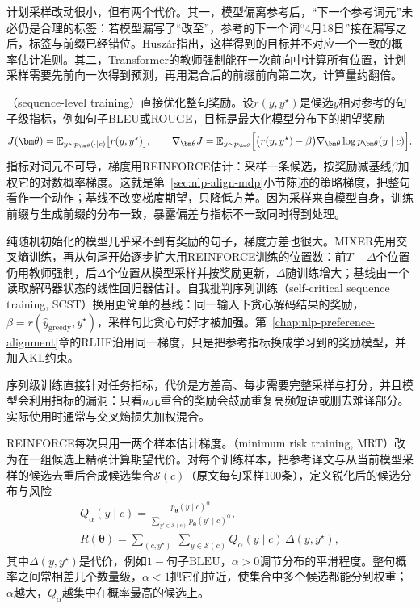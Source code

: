 计划采样改动很小，但有两个代价。其一，模型偏离参考后，“下一个参考词元”未必仍是合理的标签：若模型漏写了“改至”，参考的下一个词“4月18日”接在漏写之后，标签与前缀已经错位。Huszár指出，这样得到的目标并不对应一个一致的概率估计准则。其二，Transformer的教师强制能在一次前向中计算所有位置，计划采样需要先前向一次得到预测，再用混合后的前缀前向第二次，计算量约翻倍。

（sequence-level training）直接优化整句奖励。设$r(y,y^{\star})$是候选$y$相对参考的句子级指标，例如句子BLEU或ROUGE，目标是最大化模型分布下的期望奖励
\begin{equation}
  J(\bm\theta)=\mathbb E_{y\sim p_{\bm\theta}(\cdot\mid c)}\bigl[r(y,y^{\star})\bigr],\qquad
  \nabla_{\bm\theta}J=\mathbb E_{y\sim p_{\bm\theta}}\Bigl[\bigl(r(y,y^{\star})-\beta\bigr)\nabla_{\bm\theta}\log p_{\bm\theta}(y\mid c)\Bigr].
  \label{eq:nlp-generation-sequence-reinforce}
\end{equation}
指标对词元不可导，梯度用REINFORCE估计：采样一条候选，按奖励减基线$\beta$加权它的对数概率梯度。这就是第~\ref{sec:nlp-align-mdp}小节陈述的策略梯度，把整句看作一个动作；基线不改变梯度期望，只降低方差。因为采样来自模型自身，训练前缀与生成前缀的分布一致，暴露偏差与指标不一致同时得到处理。

纯随机初始化的模型几乎采不到有奖励的句子，梯度方差也很大。MIXER先用交叉熵训练，再从句尾开始逐步扩大用REINFORCE训练的位置数：前$T-\Delta$个位置仍用教师强制，后$\Delta$个位置从模型采样并按奖励更新，$\Delta$随训练增大；基线由一个读取解码器状态的线性回归器估计。自我批判序列训练（self-critical sequence training, SCST）换用更简单的基线：同一输入下贪心解码结果的奖励，$\beta=r(\hat y_{\mathrm{greedy}},y^{\star})$，采样句比贪心句好才被加强。第~\ref{chap:nlp-preference-alignment}章的RLHF沿用同一梯度，只是把参考指标换成学习到的奖励模型，并加入KL约束。

序列级训练直接针对任务指标，代价是方差高、每步需要完整采样与打分，并且模型会利用指标的漏洞：只看$n$元重合的奖励会鼓励重复高频短语或删去难译部分。实际使用时通常与交叉熵损失加权混合。

REINFORCE每次只用一两个样本估计梯度。（minimum risk training, MRT）改为在一组候选上精确计算期望代价。对每个训练样本，把参考译文与从当前模型采样的候选去重后合成候选集合$\mathcal S(c)$（原文每句采样100条），定义锐化后的候选分布与风险
\begin{equation}
  \begin{gathered}
  Q_\alpha(y\mid c)=\frac{p_{\bm\theta}(y\mid c)^{\alpha}}{\sum_{y'\in\mathcal S(c)}p_{\bm\theta}(y'\mid c)^{\alpha}},\\
  R(\bm\theta)=\sum_{(c,y^{\star})}\ \sum_{y\in\mathcal S(c)}Q_\alpha(y\mid c)\,\Delta(y,y^{\star}),
  \end{gathered}
  \label{eq:nlp-generation-mrt}
\end{equation}
其中$\Delta(y,y^{\star})$是代价，例如$1-\text{句子BLEU}$，$\alpha>0$调节分布的平滑程度。整句概率之间常相差几个数量级，$\alpha<1$把它们拉近，使集合中多个候选都能分到权重；$\alpha$越大，$Q_\alpha$越集中在概率最高的候选上。

